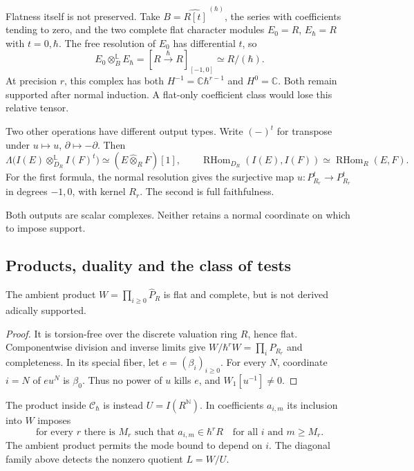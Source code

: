 Flatness itself is not preserved. Take
$B=\widehat{R[t]}^{\,(\hbar)}$, the series with coefficients
tending to zero, and the two complete flat character
modules $E_0=R$, $E_\hbar=R$ with $t=0,\hbar$.
The free resolution of $E_0$ has differential $t$, so
\[
 E_0\otimes_B^{\mathbb L}E_\hbar
       =[R\xrightarrow{\hbar}R]_{[-1,0]}
       \simeq R/(\hbar).
\]
At precision $r$, this complex has both
$H^{-1}=\mathbb C\hbar^{r-1}$ and $H^0=\mathbb C$.
Both remain supported after normal induction.
A flat-only coefficient class would lose this relative tensor.

Two other operations have different output types.
Write $(-)^t$ for transpose under
$u\mapsto u$, $\partial\mapsto-\partial$. Then
\[
 \Lambda\bigl(I(E)\otimes_{D_R}^{\mathbb L}I(F)^t\bigr)
       \simeq(E\widehat\otimes_R F)[1],
 \qquad
 \operatorname{RHom}_{D_R}(I(E),I(F))
       \simeq\operatorname{RHom}_R(E,F).
\]
For the first formula, the normal resolution gives the
surjective map $u:P_{R_r}^t\to P_{R_r}^t$ in degrees
$-1,0$, with kernel $R_r$. The second is full faithfulness.

Both outputs are scalar complexes. Neither retains a
normal coordinate on which to impose support.

\subsection{Products, duality and the class of tests}

\begin{proposition}\label{mht:prop:normal-product-failure}
The ambient product $W=\prod_{i\geq0}\widehat P_R$ is
flat and complete, but is not derived adically supported.
\end{proposition}
\begin{proof}
It is torsion-free over the discrete valuation ring $R$,
hence flat. Componentwise division and inverse limits give
$W/\hbar^rW=\prod_iP_{R_r}$ and completeness.
In its special fiber, let $e=(\beta_i)_{i\geq0}$.
For every $N$, coordinate $i=N$ of $eu^N$ is $\beta_0$.
Thus no power of $u$ kills $e$, and $W_1[u^{-1}]\ne0$.
\end{proof}

The product inside $\mathcal C_\hbar$ is instead
$U=I(R^{\mathbb N})$. In coefficients $a_{i,m}$ its
inclusion into $W$ imposes
\[
 \text{for every }r\text{ there is }M_r\text{ such that }
 a_{i,m}\in\hbar^rR\quad\text{for all }i\text{ and }m\geq M_r.
\]
The ambient product permits the mode bound to depend on $i$.
The diagonal family above detects the nonzero quotient $L=W/U$.

